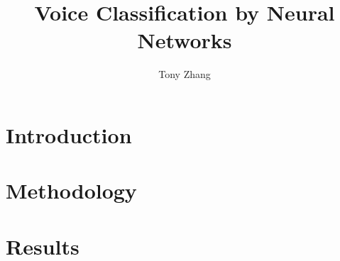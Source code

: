 \documentclass{article}
\title{Voice Classification by Neural Networks}
\author{Tony Zhang}
\begin{document}
\maketitle

\begin{abstract}
\end{abstract}

\section{Introduction}


\section{Methodology}


\section{Results}

\end{document}
